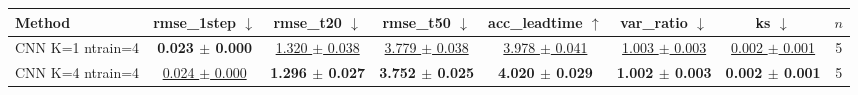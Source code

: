 \begin{tabular}{lccccccc}
\toprule
Method & rmse\_1step $\downarrow$ & rmse\_t20 $\downarrow$ & rmse\_t50 $\downarrow$ & acc\_leadtime $\uparrow$ & var\_ratio $\downarrow$ & ks $\downarrow$ & $n$ \\
\midrule
CNN K=1 ntrain=4 & \textbf{0.023 $\pm$ 0.000} & \underline{1.320 $\pm$ 0.038} & \underline{3.779 $\pm$ 0.038} & \underline{3.978 $\pm$ 0.041} & \underline{1.003 $\pm$ 0.003} & \underline{0.002 $\pm$ 0.001} & 5 \\
CNN K=4 ntrain=4 & \underline{0.024 $\pm$ 0.000} & \textbf{1.296 $\pm$ 0.027} & \textbf{3.752 $\pm$ 0.025} & \textbf{4.020 $\pm$ 0.029} & \textbf{1.002 $\pm$ 0.003} & \textbf{0.002 $\pm$ 0.001} & 5 \\
\bottomrule
\end{tabular}

